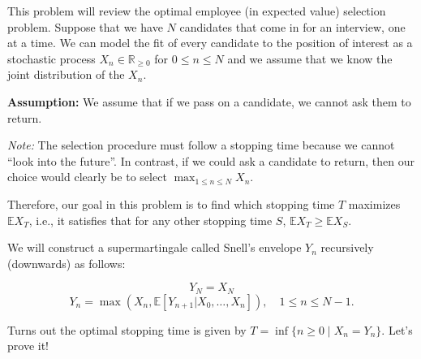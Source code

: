 \documentclass{article}
\begin{document}
This problem will review the optimal employee (in expected value) selection problem. Suppose that we have $N$ candidates that come in for an interview, one at a time. We can model the fit of every candidate to the position of interest as a stochastic process $X_n \in \mathbb{R}_{\geq 0}$ for $0 \leq n \leq N$ and we assume that we know the joint distribution of the $X_n$.

\textbf{Assumption:} We assume that if we pass on a candidate, we cannot ask them to return.

\textit{Note:} The selection procedure must follow a stopping time because we cannot ``look into the future''. In contrast, if we could ask a candidate to return, then our choice would clearly be to select $\max_{1 \leq n \leq N} X_n$.

Therefore, our goal in this problem is to find which stopping time $T$ maximizes $\mathbb{E}X_T$, i.e., it satisfies that for any other stopping time $S$, $\mathbb{E}X_T \geq \mathbb{E}X_S$.

We will construct a supermartingale called Snell’s envelope $Y_n$ recursively (downwards) as follows:

\[
Y_N = X_N
\]
\[
Y_n = \max(X_n, \mathbb{E}[Y_{n+1} | X_0, \ldots, X_n]), \quad 1 \leq n \leq N-1.
\]

Turns out the optimal stopping time is given by $T = \inf\{n \geq 0 \mid X_n = Y_n\}$. Let’s prove it!
\end{document}
